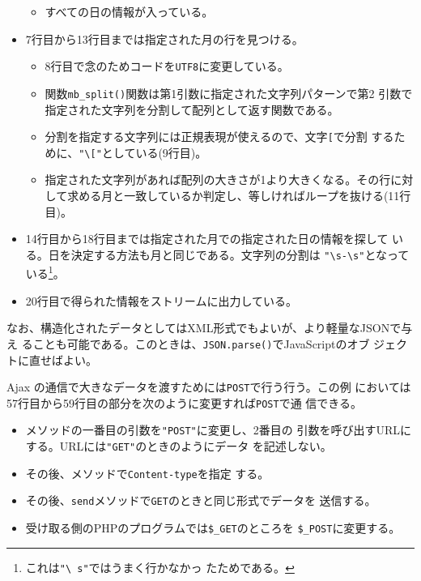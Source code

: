 \begin{Exec}
\begin{itemize}
\begin{itemize}
 \item すべての日の情報が入っている。
\end{itemize}
 \item 7行目から13行目までは指定された月の行を見つける。
\begin{itemize}
 \item 8行目で念のためコードを\texttt{UTF8}に変更している。
 \item 関数\Verb+mb_split()+関数は第1引数に指定された文字列パターンで第2
       引数で指定された文字列を分割して配列として返す関数である。
 \item 分割を指定する文字列には正規表現が使えるので、文字\Verb+[+で分割
       するために、\Verb+"\["+としている(9行目)。
 \item 指定された文字列があれば配列の大きさが1より大きくなる。その行に対
       して求める月と一致しているか判定し、等しければループを抜ける(11行
       目)。
\end{itemize}
 \item 14行目から18行目までは指定された月での指定された日の情報を探して
       いる。日を決定する方法も月と同じである。文字列の分割は
       \Verb+"\s-\s"+となっている\footnote{これは\texttt{"\textbackslash
       s"}ではうまく行かなかっ
       たためである。}。
 \item 20行目で得られた情報をストリームに出力している。
\end{itemize}
\end{Exec}
なお、構造化されたデータとしてはXML形式でもよいが、より軽量なJSONで与え
ることも可能である。このときは、\texttt{JSON.parse()}でJavaScriptのオブ
ジェクトに直せばよい。


Ajax の通信で大きなデータを渡すためには\texttt{POST}で行う行う。この例
においては57行目から59行目の部分を次のように変更すれば\texttt{POST}で通
信できる。
\begin{itemize}
 \item {}メソッドの一番目の引数を\Verb+"POST"+に変更し、2番目の
			 引数を呼び出すURLにする。URLには\Verb+"GET"+のときのようにデータ
			 を記述しない。
 \item その後、メソッドで\Verb+Content-type+を指定
			 する。
 \item その後、\Verb+send+メソッドで\Verb+GET+のときと同じ形式でデータを
			 送信する。
 \item 受け取る側のPHPのプログラムでは\Verb+$_GET+のところを
			 \Verb+$_POST+に変更する。
\end{itemize}